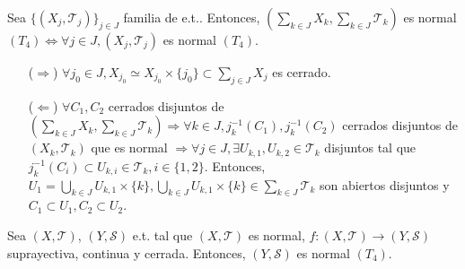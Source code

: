 \begin{prop}
  Sea $\{ ( X_{j}, \mathcal{T}_{j} ) \}_{j \in J}$ familia de e.t.. Entonces, $( \sum_{k \in J} X_{k}, \sum_{k \in J} \mathcal{T}_{k})$ es normal $(T_{4}) \Leftrightarrow \forall j \in J, ( X_{j}, \mathcal{T}_{j} )$ es normal $(T_{4})$.
\end{prop}

\begin{dem}
  \begin{enumerate}[label=(\roman*)]
    \item [($\Rightarrow$)] $\forall j_{0} \in J, X_{j_{0}} \simeq X_{j_{0}} \times \{ j_{0} \} \subset \sum_{ j \in J } X_{j}$ es cerrado.
    \item [($\Leftarrow$)] $\forall C_{1}, C_{2}$ cerrados disjuntos de $( \sum_{k \in J} X_{k}, \sum_{k \in J} \mathcal{T}_{k}) \Rightarrow \forall k \in J, j_{k}^{-1}(C_{1}), j_{k}^{-1}(C_{2})$ cerrados disjuntos de $( X_{k}, \mathcal{T}_{k} )$ que es normal $\Rightarrow \forall j \in J, \exists U_{k,1}, U_{k,2} \in \mathcal{T}_{k}$ disjuntos tal que $j_{k}^{-1}(C_{i}) \subset U_{k,i} \in \mathcal{T}_{k}, i \in \{ 1, 2 \}$. Entonces, $U_{1} = \bigcup_{k \in J} U_{k,1} \times \{ k \}, \bigcup_{k \in J} U_{k,1} \times \{ k \} \in \sum_{k \in J} \mathcal{T}_{k}$ son abiertos disjuntos y $C_{1} \subset U_{1}, C_{2} \subset U_{2}$.
  \end{enumerate}
\end{dem}

\begin{prop}
  Sea $( X, \mathcal{T} )$, $( Y, \mathcal{S} )$ e.t. tal que $ ( X, \mathcal{T} )$ es normal, $f: ( X, \mathcal{T} ) \to ( Y, \mathcal{S} )$ suprayectiva, continua y cerrada. Entonces, $( Y, \mathcal{S} )$ es normal $(T_{4})$.
\end{prop}

